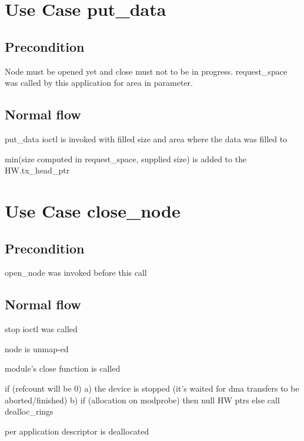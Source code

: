   \section{Use Case put\_data}

  \subsection{Precondition}
  Node must be opened yet and close must not to be in progress.
  request\_space was called by this application for area in parameter.

  \subsection{Normal flow}
  \begin{CompactEnumerate}
    \item put\_data ioctl is invoked with filled size and area where the data was
  filled to
    \item min(size computed in request\_space, supplied size) is added to the
  HW.tx\_head\_ptr
  \end{CompactEnumerate}

  \section{Use Case close\_node}

  \subsection{Precondition}
  open\_node was invoked before this call

  \subsection{Normal flow}
  \begin{CompactEnumerate}
    \item stop ioctl was called
    \item node is unmap-ed
    \item module's close function is called
    \item if (refcount will be 0)
  a) the device is stopped (it's waited for dma transfers to be
  aborted/finished)
  b) if (allocation on modprobe) then null HW ptrs else call dealloc\_rings
    \item per application descriptor is deallocated
  \end{CompactEnumerate}


